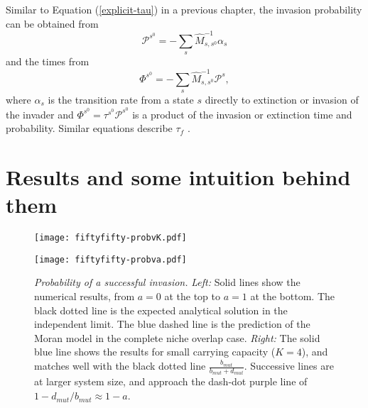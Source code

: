Similar to Equation (\ref{explicit-tau}) in a previous chapter, the invasion probability can be obtained from \cite{Nisbet1982,Iyer-Biswas2015}
\begin{equation}
\mathcal{P}^{s^0} = -\sum_s \hat{M}^{-1}_{s,s^0}\alpha_{s} %
\end{equation}
and the times from
\begin{equation}
\Phi^{s^0} = -\sum_s \hat{M}^{-1}_{s,s^0}\mathcal{P}^{s}, %
\end{equation} \label{conditionalPhi}
where $\alpha_s$ is the transition rate from a state $s$ directly to extinction or invasion of the invader and $\Phi^{s^0}=\tau^{s^0}\mathcal{P}^{s^0}$ is a product of the invasion or extinction time and probability. 
Similar equations describe $\tau_f$ \cite{Nisbet1982,Iyer-Biswas2015}.


\section{Results and some intuition behind them}
\begin{figure}[h]
	\centering
	\begin{minipage}{0.49\linewidth}
		\centering
		\texttt{[image: fiftyfifty-probvK.pdf]}
	\end{minipage}
	\begin{minipage}{0.49\linewidth}
		\centering
		\texttt{[image: fiftyfifty-probva.pdf]}
	\end{minipage}
	\caption{\emph{Probability of a successful invasion.}
		\emph{Left:} Solid lines show the numerical results, from $a=0$ at the top to $a=1$ at the bottom. The black dotted line is the expected analytical solution in the independent limit. The blue dashed line is the prediction of the Moran model in the complete niche overlap case.
		\emph{Right:} The solid blue line shows the results for small carrying capacity ($K=4$), and matches well with the black dotted line $\frac{b_{mut}}{b_{mut}+d_{mut}}$. Successive lines are at larger system size, and approach the dash-dot purple line of $1-d_{mut}/b_{mut}\approx 1-a$.
	} \label{Esucc}
\end{figure}

